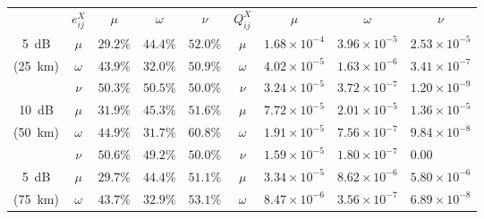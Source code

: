 \vspace*{\fill}

\begin{table}[htbp]
\centering
\begin{tabular}{cclllclll}
        & $e^X_{ij}$ & \multicolumn{1}{c}{$\mu$} & \multicolumn{1}{c}{$\omega$} & \multicolumn{1}{c}{$\nu$} & $Q^X_{ij}$ & \multicolumn{1}{c}{$\mu$} & \multicolumn{1}{c}{$\omega$} & \multicolumn{1}{c}{$\nu$} \vspace{5pt}\\
\SI{5}{dB}  & $\mu$        & $29.2\%$                  & $44.4\%$                  & $52.0\%$                  & $\mu$        & $1.68\times10^{-4}$     & $3.96\times10^{-5}$     & $2.53\times10^{-5}$     \\
(\SI{25}{\km}) & $\omega$        & $43.9\%$                  & $32.0\%$                  & $50.9\%$                  & $\omega$        & $4.02\times10^{-5}$     & $1.63\times10^{-6}$     & $3.41\times10^{-7}$     \\
        & $\nu$        & $50.3\%$                  & $50.5\%$                  & $50.0\%$                  & $\nu$        & $3.24\times10^{-5}$     & $3.72\times10^{-7}$     & $1.20\times10^{-9}$     \vspace{5pt}\\
        \SI{10}{dB}  & $\mu$        & $31.9\%$                  & $45.3\%$                  & $51.6\%$                  & $\mu$        & $7.72\times10^{-5}$     & $2.01\times10^{-5}$     & $1.36\times10^{-5}$     \\
(\SI{50}{\km}) & $\omega$        & $44.9\%$                  & $31.7\%$                  & $60.8\%$                  & $\omega$        & $1.91\times10^{-5}$     & $7.56\times10^{-7}$     & $9.84\times10^{-8}$\\
        & $\nu$        & $50.6\%$                  & $49.2\%$                  & $50.0\%$	 & $\nu$        & $1.59\times10^{-5}$     & $1.80\times10^{-7}$     & $0.00$     \vspace{5pt}\\
        \SI{5}{dB}  & $\mu$        & $29.7\%$                  & $44.4\%$                  & $51.1\%$                  & $\mu$        & $3.34\times10^{-5}$     & $8.62\times10^{-6}$     & $5.80\times10^{-6}$     \\
(\SI{75}{\km}) & $\omega$        & $43.7\%$                  & $32.9\%$                  & $53.1\%$                  & $\omega$        & $8.47\times10^{-6}$     & $3.56\times10^{-7}$     & $6.89\times10^{-8}$\\

\end{tabular}
\end{table}
